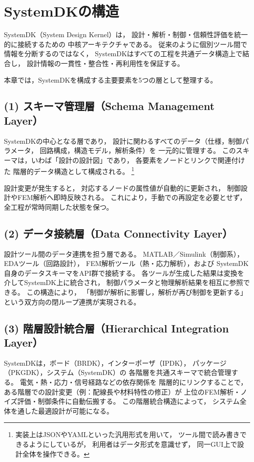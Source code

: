 \section{SystemDKの構造}

SystemDK（System Design Kernel）は，
設計・解析・制御・信頼性評価を統一的に接続するための
中核アーキテクチャである。
従来のように個別ツール間で情報を分断するのではなく，
SystemDKはすべての工程を共通データ構造上で結合し，
設計情報の一貫性・整合性・再利用性を保証する。

本章では，SystemDKを構成する主要要素を5つの層として整理する。

\subsection{(1) スキーマ管理層（Schema Management Layer）}
SystemDKの中心となる層であり，
設計に関わるすべてのデータ（仕様，制御パラメータ，
回路構成，構造モデル，解析条件）を
一元的に管理する。
このスキーマは，いわば「設計の設計図」であり，
各要素をノードとリンクで関連付けた
階層的データ構造として構成される。
\footnote{実装上はJSONやYAMLといった汎用形式を用いて，
ツール間で読み書きできるようにしているが，
利用者はデータ形式を意識せず，
同一GUI上で設計全体を操作できる。}

設計変更が発生すると，
対応するノードの属性値が自動的に更新され，
制御設計やFEM解析へ即時反映される。
これにより，手動での再設定を必要とせず，
全工程が常時同期した状態を保つ。

\subsection{(2) データ接続層（Data Connectivity Layer）}
設計ツール間のデータ連携を担う層である。
MATLAB／Simulink（制御系），EDAツール（回路設計），
FEM解析ツール（熱・応力解析），および
SystemDK自身のデータスキーマをAPI群で接続する。
各ツールが生成した結果は変換を介してSystemDK上に統合され，
制御パラメータと物理解析結果を相互に参照できる。
この構造により，
「制御が解析に影響し，解析が再び制御を更新する」
という双方向の閉ループ連携が実現される。

\subsection{(3) 階層設計統合層（Hierarchical Integration Layer）}
SystemDKは，ボード（BRDK），インターポーザ（IPDK），
パッケージ（PKGDK），システム（SystemDK）の
各階層を共通スキーマで統合管理する。
電気・熱・応力・信号経路などの依存関係を
階層的にリンクすることで，
ある階層での設計変更（例：配線長や材料特性の修正）が
上位のFEM解析・ノイズ評価・制御条件に自動伝搬する。
この階層統合構造によって，
システム全体を通した最適設計が可能になる。


